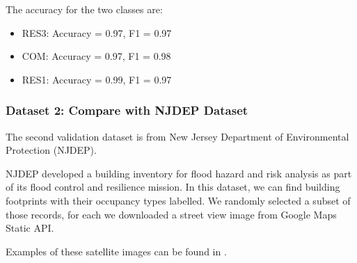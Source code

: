\documentclass[letterpaper,10pt,english]{sphinxmanual}
\begin{document}
\sphinxAtStartPar
The accuracy for the two classes are:
\begin{itemize}
\item {} 
\sphinxAtStartPar
RES3: Accuracy = 0.97, F1 = 0.97

\item {} 
\sphinxAtStartPar
COM: Accuracy = 0.97, F1 = 0.98

\item {} 
\sphinxAtStartPar
RES1: Accuracy = 0.99, F1 = 0.97

\end{itemize}


\subsubsection{Dataset 2: Compare with NJDEP Dataset}
\label{\detokenize{common/technical_manual/occupancy:dataset-2-compare-with-njdep-dataset}}
\sphinxAtStartPar
The second validation dataset is from New Jersey Department of Environmental Protection (NJDEP).

\sphinxAtStartPar
NJDEP developed a building inventory for flood hazard and risk analysis as part of its flood control and resilience mission.
In this dataset, we can find building footprints with their occupancy types labelled.
We randomly selected a subset of those records, for each we downloaded a street view image from Google Maps Static API.

\sphinxAtStartPar
Examples of these satellite images can be found in {\hyperref[\detokenize{common/technical_manual/occupancyTheory:occupancytheory}]{}}.
\end{document}
